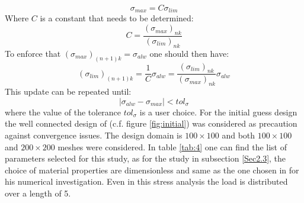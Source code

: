 \begin{equation}
\sigma_{max}=C\sigma_{lim}
\end{equation}  
Where $C$ is a constant that needs to be determined:
\begin{equation}
C=\frac{(\sigma_{max})_{nk}}{(\sigma_{lim})_{nk}}
\end{equation}
To enforce that $(\sigma_{max})_{(n+1)k}=\sigma_{alw}$ one should then have:
\begin{equation}
\label{eq.3.115}
(\sigma_{lim})_{(n+1)k}=\frac{1}{C}\sigma_{alw}=\frac{(\sigma_{lim})_{nk}}{(\sigma_{max})_{nk}}\sigma_{alw}
\end{equation}
This update can be repeated until:
\begin{equation}
\label{eq.3.116}
|\sigma_{alw}-\sigma_{max}|<tol_{\sigma}
\end{equation}
where the value of the tolerance $tol_{\sigma}$ is a user choice. 
For the initial guess design the well connected design of \cite{ZHANG20171} (c.f. figure \ref{fig:initial}) was considered as precaution against convergence issues. 
The design domain is $100\times100$ and both $100\times100$ and $200\times200$ meshes were considered. In table \ref{tab:4} one can find the list of parameters selected for this study, as for the study in subsection \ref{Sec2.3}, the choice of material properties are dimensionless and same as the one chosen in \cite{verbart2017unified} for his numerical investigation. Even in this stress analysis the load is distributed over a length of 5.
